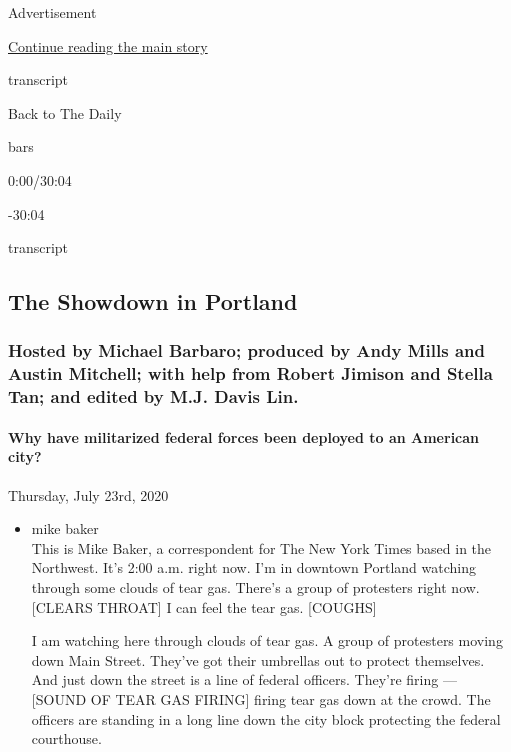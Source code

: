Advertisement

\protect\hyperlink{after-top}{Continue reading the main story}

transcript

Back to The Daily

bars

0:00/30:04

-30:04

transcript

\hypertarget{the-showdown-in-portland}{%
\subsection{The Showdown in Portland}\label{the-showdown-in-portland}}

\hypertarget{hosted-by-michael-barbaro-produced-by-andy-mills-and-austin-mitchell-with-help-from-robert-jimison-and-stella-tan-and-edited-by-mj-davis-lin}{%
\subsubsection{Hosted by Michael Barbaro; produced by Andy Mills and
Austin Mitchell; with help from Robert Jimison and Stella Tan; and
edited by M.J. Davis
Lin.}\label{hosted-by-michael-barbaro-produced-by-andy-mills-and-austin-mitchell-with-help-from-robert-jimison-and-stella-tan-and-edited-by-mj-davis-lin}}

\hypertarget{why-have-militarized-federal-forces-been-deployed-to-an-american-city}{%
\paragraph{Why have militarized federal forces been deployed to an
American
city?}\label{why-have-militarized-federal-forces-been-deployed-to-an-american-city}}

Thursday, July 23rd, 2020

\begin{itemize}
\item
  mike baker\\
  This is Mike Baker, a correspondent for The New York Times based in
  the Northwest. It's 2:00 a.m. right now. I'm in downtown Portland
  watching through some clouds of tear gas. There's a group of
  protesters right now. {[}CLEARS THROAT{]} I can feel the tear gas.
  {[}COUGHS{]}

  I am watching here through clouds of tear gas. A group of protesters
  moving down Main Street. They've got their umbrellas out to protect
  themselves. And just down the street is a line of federal officers.
  They're firing --- {[}SOUND OF TEAR GAS FIRING{]} firing tear gas down
  at the crowd. The officers are standing in a long line down the city
  block protecting the federal courthouse.
\end{itemize}

